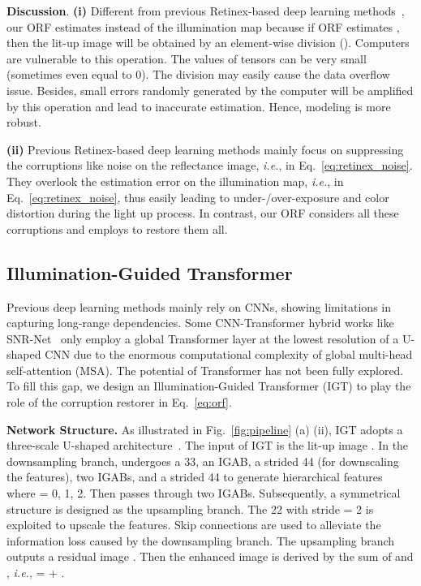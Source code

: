 \documentclass[10pt,twocolumn,letterpaper]{article}
\begin{document}
\vspace{0.5mm}
\noindent\textbf{Discussion}. \textbf{(i)} Different from previous Retinex-based deep learning methods~\cite{ruas,deep_upe,retinex_net,kind_plus,kind}, our ORF estimates  instead of the illumination map  because if ORF estimates , then the lit-up image will be obtained by an element-wise division (). Computers are vulnerable to this operation. The values of tensors can be very small (sometimes even equal to 0). The division may easily cause the data overflow issue. Besides, small  errors randomly generated by the computer will be amplified by this operation and lead to inaccurate estimation. Hence, modeling  is more robust.

\noindent\textbf{(ii)} Previous Retinex-based deep learning methods mainly focus on suppressing the corruptions like noise on the reflectance image, \emph{i.e.},  in Eq.~\eqref{eq:retinex_noise}. They overlook the estimation error on the illumination map, \emph{i.e.},  in Eq.~\eqref{eq:retinex_noise}, thus easily leading to under-/over-exposure and color distortion during the light up process. In contrast, our ORF considers all these corruptions and employs  to restore them all.

\vspace{-1mm}
\subsection{Illumination-Guided Transformer}
\vspace{-1mm}
Previous deep learning methods mainly rely on CNNs, showing limitations in capturing long-range dependencies. Some CNN-Transformer hybrid works like SNR-Net~\cite{snr_net} only employ a global Transformer layer at the lowest resolution of a U-shaped CNN due to the enormous computational complexity of global multi-head self-attention (MSA). The potential of Transformer has not been fully explored. To fill this gap, we design an Illumination-Guided Transformer (IGT) to play the role of the corruption restorer  in Eq.~\eqref{eq:orf}.

\vspace{0.5mm}
\noindent\textbf{Network Structure.} As illustrated in Fig.~\ref{fig:pipeline} (a) (ii), IGT adopts a three-scale U-shaped architecture~\cite{unet}. The input of IGT is the lit-up image . In the downsampling branch,   undergoes a 33, an IGAB, a strided 44 (for downscaling the features), two IGABs, and a strided 44 to generate hierarchical features  where  = 0, 1, 2. Then  passes through two IGABs. Subsequently, a symmetrical structure is designed as the upsampling branch. The 22 with stride = 2 is exploited to upscale the features. Skip connections are used to alleviate the information loss caused by the downsampling branch. The upsampling branch outputs a residual image . Then the enhanced image  is derived by the sum of  and , \emph{i.e.},  =  + .
\end{document}
